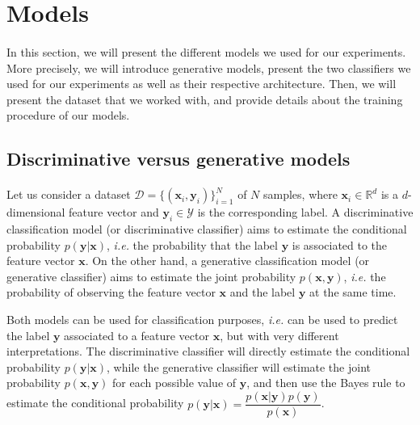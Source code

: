 \documentclass[10pt,twocolumn,letterpaper]{article}
\begin{document}
\section{Models}
\label{sec:models}

\paragraph{} In this section, we will present the different models we used for our experiments. More precisely, we will introduce generative models, present the two classifiers we used for our experiments as well as their respective architecture. Then, we will present the dataset that we worked with, and provide details about the training procedure of our models.

\subsection{Discriminative versus generative models}

\paragraph{} Let us consider a dataset $\mathcal{D} = \{(\bm{x}_i, \bm{y}_i)\}_{i=1}^N$ of $N$ samples, where $\bm{x}_i \in \mathbb{R}^d$ is a $d$-dimensional feature vector and $\bm{y}_i \in \mathcal{Y}$ is the corresponding label. A discriminative classification model (or discriminative classifier) aims to estimate the conditional probability $p(\bm{y}|\bm{x})$, \textit{i.e.} the probability that the label $\bm{y}$ is associated to the feature vector $\bm{x}$. On the other hand, a generative classification model (or generative classifier) aims to estimate the joint probability $p(\bm{x}, \bm{y})$, \textit{i.e.} the probability of observing the feature vector $\bm{x}$ and the label $\bm{y}$ at the same time. 

Both models can be used for classification purposes, \textit{i.e.} can be used to predict the label $\bm{y}$ associated to a feature vector $\bm{x}$, but with very different interpretations. The discriminative classifier will directly estimate the conditional probability $p(\bm{y}|\bm{x})$, while the generative classifier will estimate the joint probability $p(\bm{x}, \bm{y})$ for each possible value of $\bm{y}$, and then use the Bayes rule to estimate the conditional probability $p(\bm{y}|\bm{x}) = \dfrac{p(\bm{x}|\bm{y})p(\bm{y})}{p(\bm{x})}$.
\end{document}
